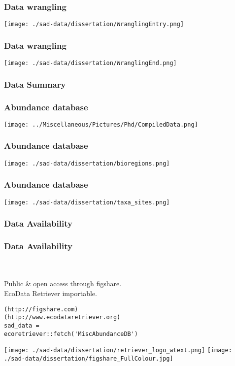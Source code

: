\documentclass[14pt]{beamer}
\begin{document}
\begin{frame}[t]
\frametitle{Data wrangling}
\begin{center}
\texttt{[image: ./sad-data/dissertation/WranglingEntry.png]}
\end{center}
\end{frame}

\begin{frame}[t]
\frametitle{Data wrangling}
\begin{center}
\texttt{[image: ./sad-data/dissertation/WranglingEnd.png]}
\end{center}
\end{frame}

\subsubsection{Data Summary}
\begin{frame}{}
\frametitle{Abundance database}
\texttt{[image: ../Miscellaneous/Pictures/Phd/CompiledData.png]}
\end{frame}

\begin{frame}{}
\frametitle{Abundance database}
\texttt{[image: ./sad-data/dissertation/bioregions.png]}
\end{frame}

\begin{frame}{}
\frametitle{Abundance database}
\texttt{[image: ./sad-data/dissertation/taxa\_sites.png]}
\end{frame}

\subsubsection{Data Availability}
\begin{frame}[fragile]
\frametitle{Data Availability}
~\\
~\\
Public \& open access through figshare.\\
EcoData Retriever importable.\\
\begin{verbatim}
(http://figshare.com)
(http://www.ecodataretriever.org)
sad_data = 
ecoretriever::fetch('MiscAbundanceDB')
\end{verbatim}
\texttt{[image: ./sad-data/dissertation/retriever\_logo\_wtext.png]}
\texttt{[image: ./sad-data/dissertation/figshare\_FullColour.jpg]}
\end{frame}
\end{document}
